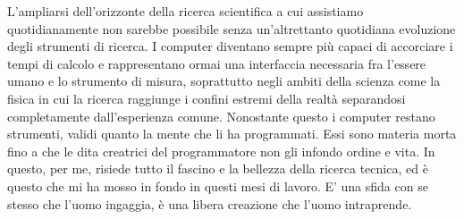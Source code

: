 \documentclass[../main.tex]{subfiles}
\begin{document}
L'ampliarsi dell'orizzonte della ricerca scientifica a cui assistiamo quotidianamente non sarebbe possibile senza un'altrettanto quotidiana evoluzione degli strumenti di ricerca. I computer diventano sempre più capaci di accorciare i tempi di calcolo e rappresentano ormai una interfaccia necessaria fra l'essere umano e lo strumento di misura, soprattutto negli ambiti della scienza come la fisica in cui la ricerca raggiunge i confini estremi della realtà separandosi completamente dall'esperienza comune. Nonostante questo i computer restano strumenti, validi quanto la mente che li ha programmati. Essi sono materia morta fino a che le dita creatrici del programmatore non gli infondo ordine e vita. In questo, per me, risiede tutto il fascino e la bellezza della ricerca tecnica, ed è questo che mi ha mosso in fondo in questi mesi di lavoro. E' una sfida con se stesso che l'uomo ingaggia, è una libera creazione che l'uomo intraprende.
\end{document}
